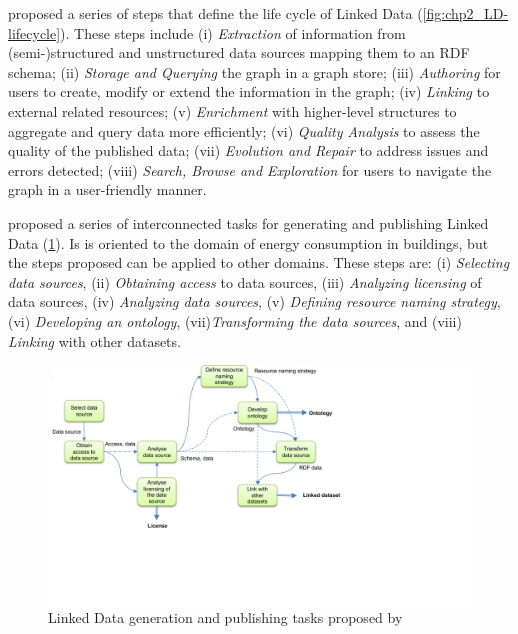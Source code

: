 \cite{ngomo2014LD-lifecycle} proposed a series of steps that define the life cycle of Linked Data (\cref{fig:chp2_LD-lifecycle}). 
These steps include 
(i) \textit{Extraction} of information from (semi-)structured and unstructured data sources mapping them to an RDF schema; 
(ii) \textit{Storage and Querying} the graph in a graph store; 
(iii) \textit{Authoring} for users to create, modify or extend the information in the graph;
(iv) \textit{Linking} to external related resources;
(v) \textit{Enrichment} with higher-level structures to aggregate and query data more efficiently;
(vi) \textit{Quality Analysis} to assess the quality of the published data;
(vii) \textit{Evolution and Repair} to address issues and errors detected;
(viii) \textit{Search, Browse and Exploration} for users to navigate the graph in a user-friendly manner. 

\cite{radulovic2015guidelinesLD} proposed a series of interconnected tasks for generating and publishing Linked Data (\cref{fig:chp2_LD-radulovic}). Is is oriented to the domain of energy consumption in buildings, but the steps proposed can be applied to other domains. These steps are: (i) \textit{Selecting data sources}, (ii) \textit{Obtaining access} to data sources, (iii) \textit{Analyzing licensing} of data sources, (iv) \textit{Analyzing data sources}, (v) \textit{Defining resource naming strategy}, (vi) \textit{Developing an ontology}, (vii)\textit{Transforming the data sources}, and (viii) \textit{Linking} with other datasets. 

\begin{figure}[]
\centering
\includegraphics[width=0.8\linewidth]{figures/chp2_LD-radulovic.pdf}
\caption{Linked Data generation and publishing tasks proposed by \cite{radulovic2015guidelinesLD}}
\label{fig:chp2_LD-radulovic}
\end{figure}

